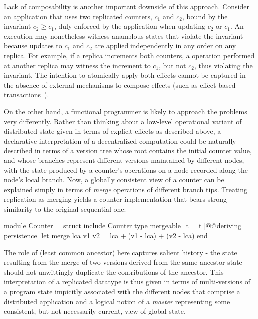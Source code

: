 Lack of composability is another important downside of this approach.
Consider an application that uses two replicated counters, $c_1$ and
$c_2$, bound by the invariant $c_2 \ge c_1$, duly enforced by the
application when updating $c_2$ or $c_1$.  An execution may
nonetheless witness anamolous states that violate the invariant
because updates to $c_1$ and $c_2$ are applied independently in any
order on any replica.  For example, if a replica increments both
counters, a  operation performed at another replica may
witness the increment to $c_1$, but not $c_2$, thus violating the
invariant. The intention to atomically apply both effects cannot be
captured in the absence of external mechanisms to compose effects
(such as effect-based transactions~\cite{pldi15}).

On the other hand, a functional programmer is likely to approach the
problems very differently.  Rather than thinking about a low-level
operational variant of distributed state given in terms of explicit
effects as described above, a declarative interpretation of a
decentralized computation could be naturally described in terms of a
version tree whose root contains the initial counter value, and whose
branches represent different versions maintained by different nodes,
with the state produced by a counter's operations on a node recorded
along the node's local branch.  Now, a globally consistent view of a
counter can be explained simply in terms of \emph{merge} operations of
different branch tips.  Treating replication as merging yields a
counter implementation that bears strong similarity to the original
sequential one:
  \begin{ocaml}
    module Counter = struct
      include Counter
      type mergeable_t = t [@@deriving persistence]
      let merge lca v1 v2 = lca + (v1 - lca) + (v2 - lca)
    end
  \end{ocaml}
The role of  (least common ancestor) here captures salient
history - the state resulting from the merge of two versions derived
from the same ancestor state should not unwittingly duplicate the
contributions of the ancestor.  This interpretation of a replicated
datatype is thus given in terms of multi-versions of a program state
impicitly associated with the different nodes that comprise a
distributed application and a logical notion of a \emph{master}
representing some consistent, but not necessarily current, view of
global state.
